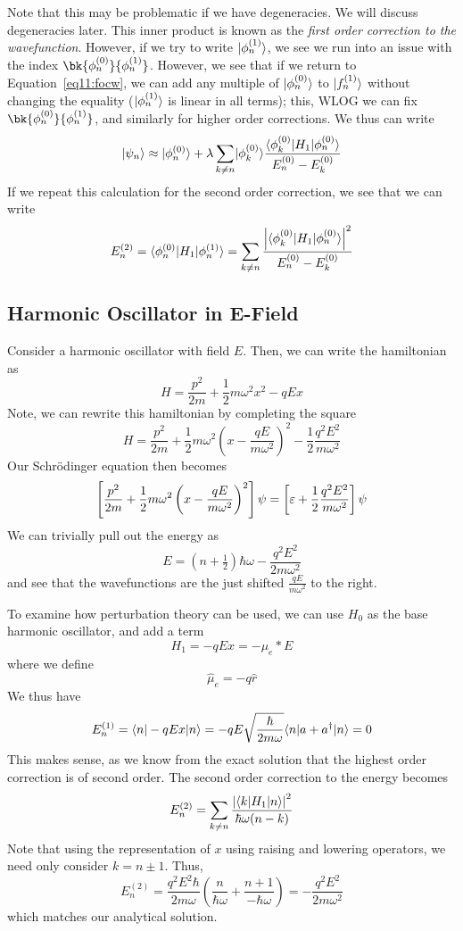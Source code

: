 Note that this may be problematic if we have degeneracies. We will discuss degeneracies later. This inner product is known as the \emph{first order correction to the wavefunction}. However, if we try to write \(\lvert\phi_n^{(1)}\rangle\), we see we run into an issue with the index \(\bk{\f_n^{(0)}}{\f_n^{(1)}}\). However, we see that if we return to Equation~\ref{eq11:focw}, we can add any multiple of \(\lvert\phi_n^{(0)}\rangle\) to \(\lvert f_n^{(1)}\rangle\) without changing the equality (\(\lvert\phi_n^{(1)}\rangle\) is linear in all terms); this, WLOG we can fix \(\bk{\f_n^{(0)}}{\f_n^{(1)}}\), and similarly for higher order corrections. We thus can write
\[\lvert\psi_n\rangle\approx \lvert\phi_n^{(0)}\rangle+\lambda\sum_{k\neq n}\lvert\phi_k^{(0)}\rangle\frac{\langle\phi_k^{(0)}\rvert H_1\lvert\phi_n^{(0)}\rangle}{E_n^{(0)}-E_k^{(0)}}\]
If we repeat this calculation for the second order correction, 
we see that we can write
\[E_n^{(2)} = \langle\phi_n^{(0)}\rvert H_1\lvert\phi_n^{(1)}\rangle=\sum_{k\neq n}\frac{\left|\langle\phi_k^{(0)}\rvert H_1\lvert\phi_n^{(0)}\rangle\right|^2}{E_n^{(0)}-E_k^{(0)}}\]

\subsection{Harmonic Oscillator in E-Field}
Consider a harmonic oscillator with field \(E\). Then, we can write the hamiltonian as
\[H = \frac{p^2}{2m}+\frac{1}{2}m\omega^2 x^2 - qEx\]
Note, we can rewrite this hamiltonian by completing the square
\[H = \frac{p^2}{2m}+\frac{1}{2}m\omega^2\left(x-\frac{qE}{m\omega^2}\right)^2-\frac{1}{2}\frac{q^2E^2}{m\omega^2}\]
Our Schr\"odinger equation then becomes
\[\left[\frac{p^2}{2m}+\frac{1}{2}m\omega^2\left(x-\frac{qE}{m\omega^2}\right)^2\right]\psi = \left[\varepsilon+\frac{1}{2}\frac{q^2E^2}{m\omega^2}\right]\psi\]
We can trivially pull out the energy as
\[E = \left(n+\tfrac{1}{2}\right)\hbar\omega-\frac{q^2E^2}{2m\omega^2}\]
and see that the wavefunctions are the just shifted \(\frac{qE}{m\omega^2}\) to the right.

To examine how perturbation theory can be used, we can use \(H_0\) as the base harmonic oscillator, and add a term
\[H_1 = -qEx = -\mu_e*E\]
where we define
\[\hat\mu_e = -q\hat r\]
We thus have
\[E_n^{(1)} = \langle n\rvert-qEx\lvert n\rangle =-qE\sqrt{\frac{\hbar}{2m\omega}}\langle n\rvert a+a^{\dagger}\lvert n\rangle=0\]
This makes sense, as we know from the exact solution that the highest order correction is of second order.
The second order correction to the energy becomes
\[E_n^{(2)} = \sum_{k\neq n} \frac{\left|\langle k\rvert H_1\lvert n\rangle\right|^2}{\hbar\omega(n-k)}\]
Note that using the representation of \(x\) using raising and lowering operators, we need only consider \(k = n\pm 1\). Thus,
\[E_n^{(2)} = \frac{q^2E^2\hbar}{2m\omega}\left(\frac{n}{\hbar\omega}+\frac{n+1}{-\hbar\omega}\right) = -\frac{q^2E^2}{2m\omega^2}\]
which matches our analytical solution.

